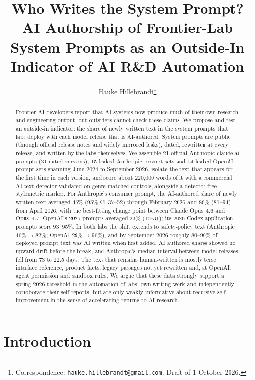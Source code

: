 \documentclass[11pt]{article}
\title{Who Writes the System Prompt?\\[2pt]
\large AI Authorship of Frontier-Lab System Prompts as an Outside-In Indicator of AI R\&D Automation}
\author{Hauke Hillebrandt\thanks{Correspondence: \texttt{hauke.hillebrandt@gmail.com}. Draft of 1 October 2026.}}
\date{}
\begin{document}
\maketitle

\begin{abstract}
Frontier AI developers report that AI systems now produce much of their own research and engineering output, but outsiders cannot check these claims. We propose and test an outside-in indicator: the share of newly written text in the system prompts that labs deploy with each model release that is AI-authored. System prompts are public (through official release notes and widely mirrored leaks), dated, rewritten at every release, and written by the labs themselves. We assemble 21 official Anthropic claude.ai prompts (31 dated versions), 15 leaked Anthropic prompt sets and 14 leaked OpenAI prompt sets spanning June 2024 to September 2026, isolate the text that appears for the first time in each version, and score about 220{,}000 words of it with a commercial AI-text detector validated on genre-matched controls, alongside a detector-free stylometric marker. For Anthropic's consumer prompt, the AI-authored share of newly written text averaged 45\% (95\% CI 37--52) through February 2026 and 89\% (81--94) from April 2026, with the best-fitting change point between Claude Opus~4.6 and Opus~4.7. OpenAI's 2025 prompts averaged 23\% (15--31); its 2026 Codex application prompts score 93--95\%. In both labs the shift extends to safety-policy text (Anthropic 46\%$\rightarrow$82\%; OpenAI 29\%$\rightarrow$96\%), and by September 2026 roughly 80--90\% of deployed prompt text was AI-written when first added. AI-authored shares showed no upward drift before the break, and Anthropic's median interval between model releases fell from 73 to 22.5 days. The text that remains human-written is mostly terse interface reference, product facts, legacy passages not yet rewritten and, at OpenAI, agent permission and sandbox rules. We argue that these data strongly support a spring-2026 threshold in the automation of labs' own writing work and independently corroborate their self-reports, but are only weakly informative about recursive self-improvement in the sense of accelerating returns to AI research.
\end{abstract}

\section{Introduction}
\end{document}
